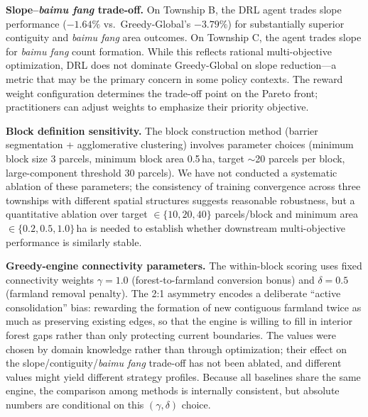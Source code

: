 \documentclass[preprint,12pt]{elsarticle}
\begin{document}
\textbf{Slope--\textit{baimu fang} trade-off.} On Township B, the DRL agent trades slope performance ($-1.64\%$ vs.\ Greedy-Global's $-3.79\%$) for substantially superior contiguity and \textit{baimu fang} area outcomes. On Township C, the agent trades slope for \textit{baimu fang} count formation. While this reflects rational multi-objective optimization, DRL does not dominate Greedy-Global on slope reduction---a metric that may be the primary concern in some policy contexts. The reward weight configuration determines the trade-off point on the Pareto front; practitioners can adjust weights to emphasize their priority objective.

\textbf{Block definition sensitivity.} The block construction method (barrier segmentation + agglomerative clustering) involves parameter choices (minimum block size 3 parcels, minimum block area 0.5\,ha, target $\sim$20 parcels per block, large-component threshold 30 parcels). We have not conducted a systematic ablation of these parameters; the consistency of training convergence across three townships with different spatial structures suggests reasonable robustness, but a quantitative ablation over target $\in\{10,20,40\}$ parcels/block and minimum area $\in\{0.2,0.5,1.0\}$\,ha is needed to establish whether downstream multi-objective performance is similarly stable.

\textbf{Greedy-engine connectivity parameters.} The within-block scoring uses fixed connectivity weights $\gamma = 1.0$ (forest-to-farmland conversion bonus) and $\delta = 0.5$ (farmland removal penalty). The 2:1 asymmetry encodes a deliberate ``active consolidation'' bias: rewarding the formation of new contiguous farmland twice as much as preserving existing edges, so that the engine is willing to fill in interior forest gaps rather than only protecting current boundaries. The values were chosen by domain knowledge rather than through optimization; their effect on the slope/contiguity/\textit{baimu fang} trade-off has not been ablated, and different values might yield different strategy profiles. Because all baselines share the same engine, the comparison among methods is internally consistent, but absolute numbers are conditional on this $(\gamma,\delta)$ choice.
\end{document}

